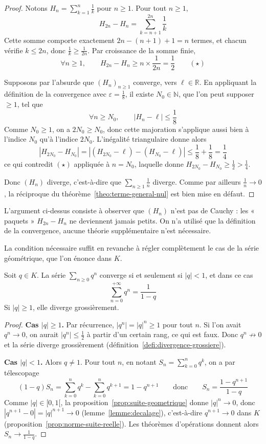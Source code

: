 \begin{proof}
Notons $H_n=\displaystyle\sum_{k=1}^{n}\frac1k$ pour $n\geq 1$. Pour tout $n\geq 1$,
\[H_{2n}-H_n = \sum_{k=n+1}^{2n}\frac{1}{k}\]
Cette somme comporte exactement $2n-(n+1)+1=n$ termes, et chacun vérifie $k\leq 2n$, donc $\frac1k\geq\frac{1}{2n}$. Par croissance de la somme finie,
\[\forall n\geq 1,\qquad H_{2n}-H_n \geq n\times\frac{1}{2n} = \frac12 \qquad (\star)\]

Supposons par l'absurde que $(H_n)_{n\geq1}$ converge, vers $\ell\in\mathbb{R}$. En appliquant la définition de la convergence avec $\varepsilon=\frac18$, il existe $N_0\in\mathbb{N}$, que l'on peut supposer $\geq 1$, tel que
\[\forall n\geq N_0,\qquad |H_n-\ell|\leq\frac18\]
Comme $N_0\geq 1$, on a $2N_0\geq N_0$, donc cette majoration s'applique aussi bien à l'indice $N_0$ qu'à l'indice $2N_0$. L'inégalité triangulaire donne alors
\[|H_{2N_0}-H_{N_0}| = |(H_{2N_0}-\ell)-(H_{N_0}-\ell)| \leq \frac18+\frac18 = \frac14\]
ce qui contredit $(\star)$ appliquée à $n=N_0$, laquelle donne $H_{2N_0}-H_{N_0}\geq\frac12>\frac14$.

Donc $(H_n)$ diverge, c'est-à-dire que $\sum_{n\geq1}\frac1n$ diverge. Comme par ailleurs $\frac1n\to0$, la réciproque du théorème~\ref{theo:terme-general-nul} est bien mise en défaut.
\end{proof}

\begin{remarque}
L'argument ci-dessus consiste à observer que $(H_n)$ n'est pas de Cauchy : les « paquets » $H_{2n}-H_n$ ne deviennent jamais petits. On n'a utilisé que la définition de la convergence, aucune théorie supplémentaire n'est nécessaire.
\end{remarque}

La condition nécessaire suffit en revanche à régler complètement le cas de la série géométrique, que l'on énonce dans $K$.

\begin{prop}
\label{prop:serie-geometrique}
Soit $q\in K$. La série $\sum_{n\geq 0}q^n$ converge si et seulement si $|q|<1$, et dans ce cas
\[\sum_{n=0}^{+\infty}q^n=\frac{1}{1-q}\]
Si $|q|\geq 1$, elle diverge grossièrement.
\end{prop}

\begin{proof}
\textbf{Cas $|q|\geq 1$.} Par récurrence, $|q^n|=|q|^n\geq 1$ pour tout $n$. Si l'on avait $q^n\to 0$, on aurait $|q^n|\leq\frac12$ à partir d'un certain rang, ce qui est faux. Donc $q^n\not\to 0$ et la série diverge grossièrement (définition~\ref{defi:divergence-grossiere}).

\textbf{Cas $|q|<1$.} Alors $q\neq 1$. Pour tout $n$, en notant $S_n=\sum_{k=0}^nq^k$, on a par télescopage
\[(1-q)S_n=\sum_{k=0}^{n}q^k-\sum_{k=0}^{n}q^{k+1}=1-q^{n+1}\qquad\text{donc}\qquad S_n=\frac{1-q^{n+1}}{1-q}\]
Comme $|q|\in[0,1[$, la proposition~\ref{prop:suite-geometrique} donne $|q|^n\to 0$, donc $|q^{n+1}-0|=|q|^{n+1}\to 0$ (lemme~\ref{lemme:decalage}), c'est-à-dire $q^{n+1}\to 0$ dans $K$ (proposition~\ref{prop:norme-suite-reelle}). Les théorèmes d'opérations donnent alors $S_n\to\frac{1}{1-q}$.
\end{proof}

